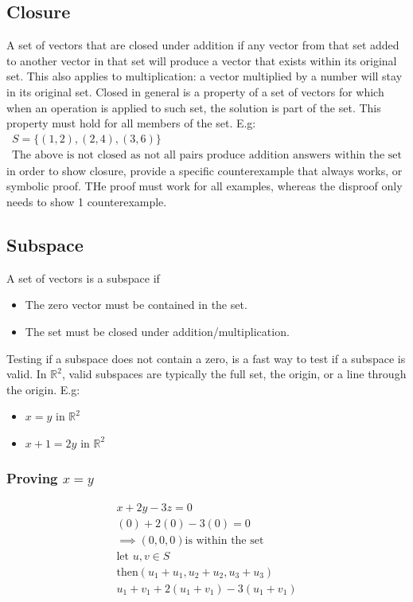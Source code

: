 \documentclass[11pt]{book}
\begin{document}
{\subsection{Closure}
\par{A set of vectors that are closed under addition if any vector from that set added to another vector in that set will produce a vector that exists within its original set. This also applies to multiplication: a vector multiplied by a number will stay in its original set. Closed in general is a property of a set of vectors for which when an operation is applied to such set, the solution is part of the set. This property must hold for all members of the set. E.g:
\begin{align*}
	S=\{\left(1,2\right), \left(2,4\right), \left(3,6\right)\} \\
	\text{The above is not closed as not all pairs produce addition answers within the set}
\end{align*}
in order to show closure, provide a specific counterexample that always works, or symbolic proof. THe proof must work for all examples, whereas the disproof only needs to show 1 counterexample.}
\subsection{Subspace}
\par{A set of vectors is a subspace if
\begin{itemize}
	\item{The zero vector must be contained in the set.}
	\item{The set must be closed under addition/multiplication.}
\end{itemize}
Testing if a subspace does not contain a zero, is a fast way to test if a subspace is valid. In $\mathbb{R}^{2}$, valid subspaces are typically the full set, the origin, or a line through the origin. E.g:
\begin{itemize}
	\item{$x=y$ in $\mathbb{R}^{2}$}
	\item{$x+1=2y$ in $\mathbb{R}^{2}$}
\end{itemize}
\subsubsection{Proving $x=y$}
\begin{align*}
	x+2y-3z=0 \\
	(0)+2(0)-3(0)=0 \\
	\implies (0,0,0) \text{is within the set} \\
	\text{let } u,v \in S\\
	\text{then} \left(u_{1}+u_{1},u_{2}+u_{2},u_{3}+u_{3}\right) \\
	u_{1}+v_{1}+2\left(u_{1}+v_{1}\right)-3\left(u_{1}+v_{1}\right)
\end{align*}
}

}
\end{document}

